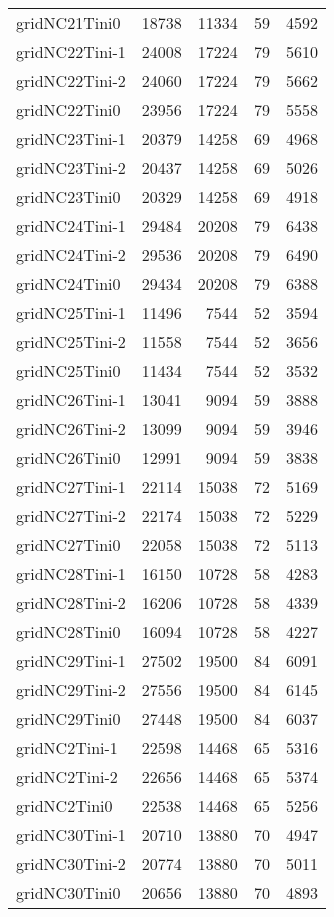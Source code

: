 \begin{longtable}{lrrrr}
gridNC21Tini0 & 18738 & 11334 & 59 & 4592 \\
gridNC22Tini-1 & 24008 & 17224 & 79 & 5610 \\
gridNC22Tini-2 & 24060 & 17224 & 79 & 5662 \\
gridNC22Tini0 & 23956 & 17224 & 79 & 5558 \\
gridNC23Tini-1 & 20379 & 14258 & 69 & 4968 \\
gridNC23Tini-2 & 20437 & 14258 & 69 & 5026 \\
gridNC23Tini0 & 20329 & 14258 & 69 & 4918 \\
gridNC24Tini-1 & 29484 & 20208 & 79 & 6438 \\
gridNC24Tini-2 & 29536 & 20208 & 79 & 6490 \\
gridNC24Tini0 & 29434 & 20208 & 79 & 6388 \\
gridNC25Tini-1 & 11496 & 7544 & 52 & 3594 \\
gridNC25Tini-2 & 11558 & 7544 & 52 & 3656 \\
gridNC25Tini0 & 11434 & 7544 & 52 & 3532 \\
gridNC26Tini-1 & 13041 & 9094 & 59 & 3888 \\
gridNC26Tini-2 & 13099 & 9094 & 59 & 3946 \\
gridNC26Tini0 & 12991 & 9094 & 59 & 3838 \\
gridNC27Tini-1 & 22114 & 15038 & 72 & 5169 \\
gridNC27Tini-2 & 22174 & 15038 & 72 & 5229 \\
gridNC27Tini0 & 22058 & 15038 & 72 & 5113 \\
gridNC28Tini-1 & 16150 & 10728 & 58 & 4283 \\
gridNC28Tini-2 & 16206 & 10728 & 58 & 4339 \\
gridNC28Tini0 & 16094 & 10728 & 58 & 4227 \\
gridNC29Tini-1 & 27502 & 19500 & 84 & 6091 \\
gridNC29Tini-2 & 27556 & 19500 & 84 & 6145 \\
gridNC29Tini0 & 27448 & 19500 & 84 & 6037 \\
gridNC2Tini-1 & 22598 & 14468 & 65 & 5316 \\
gridNC2Tini-2 & 22656 & 14468 & 65 & 5374 \\
gridNC2Tini0 & 22538 & 14468 & 65 & 5256 \\
gridNC30Tini-1 & 20710 & 13880 & 70 & 4947 \\
gridNC30Tini-2 & 20774 & 13880 & 70 & 5011 \\
gridNC30Tini0 & 20656 & 13880 & 70 & 4893 \\

\end{longtable}
